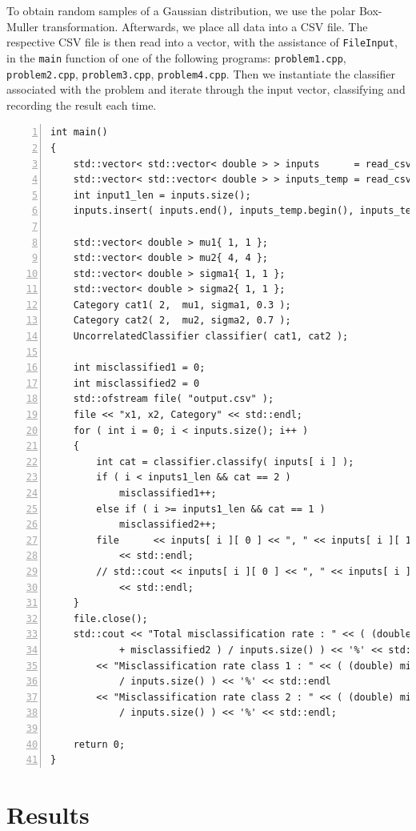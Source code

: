 \documentclass[ 12pt ]{article}
\begin{document}
To obtain random samples of a Gaussian distribution, we use the polar Box-Muller transformation. Afterwards, we place all data into a CSV file. The respective CSV file is then read into
a vector, with the assistance of \verb|FileInput|, in the \verb|main| function of one of the following programs: \verb|problem1.cpp|, \verb|problem2.cpp|, \verb|problem3.cpp|,
\verb|problem4.cpp|. Then we instantiate the classifier associated with the problem and iterate through the input vector, classifying and recording the result each time.
\begin{lstlisting}[basicstyle=\ttfamily\footnotesize, numbers=left, tabsize=4, frame=single]
int main()
{
    std::vector< std::vector< double > > inputs      = read_csv( "test1.csv" );
    std::vector< std::vector< double > > inputs_temp = read_csv( "test2.csv" );
    int input1_len = inputs.size();
    inputs.insert( inputs.end(), inputs_temp.begin(), inputs_temp.end() );

    std::vector< double > mu1{ 1, 1 };
    std::vector< double > mu2{ 4, 4 };
    std::vector< double > sigma1{ 1, 1 };
    std::vector< double > sigma2{ 1, 1 };
    Category cat1( 2,  mu1, sigma1, 0.3 );
    Category cat2( 2,  mu2, sigma2, 0.7 );
    UncorrelatedClassifier classifier( cat1, cat2 );

    int misclassified1 = 0;
    int misclassified2 = 0
    std::ofstream file( "output.csv" );
    file << "x1, x2, Category" << std::endl;
    for ( int i = 0; i < inputs.size(); i++ )
    {
        int cat = classifier.classify( inputs[ i ] );
        if ( i < inputs1_len && cat == 2 )
            misclassified1++;
        else if ( i >= inputs1_len && cat == 1 )
            misclassified2++;
        file      << inputs[ i ][ 0 ] << ", " << inputs[ i ][ 1 ] << ", " << cat
            << std::endl;
        // std::cout << inputs[ i ][ 0 ] << ", " << inputs[ i ][ 1 ] << ", " << cat
            << std::endl;
    }
    file.close();
    std::cout << "Total misclassification rate : " << ( (double) ( misclassified1
            + misclassified2 ) / inputs.size() ) << '%' << std::endl
        << "Misclassification rate class 1 : " << ( (double) misclassified1
            / inputs.size() ) << '%' << std::endl
        << "Misclassification rate class 2 : " << ( (double) misclassified2
            / inputs.size() ) << '%' << std::endl;

    return 0;
}
\end{lstlisting}

\section*{Results}
\end{document}
